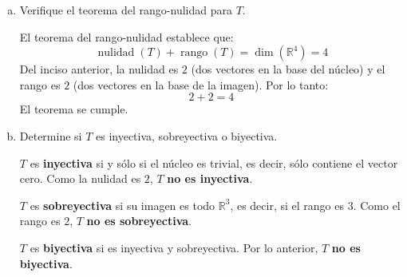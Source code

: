 \begin{prob}
\begin{enumerate}[(a)]
\item Verifique el teorema del rango-nulidad para $T$.
\begin{myproof}
El teorema del rango-nulidad establece que:
\[
\operatorname{nulidad}(T) + \operatorname{rango}(T) = \dim(\mathbb{R}^4) = 4
\]
Del inciso anterior, la nulidad es $2$ (dos vectores en la base del núcleo) y el rango es $2$ (dos vectores en la base de la imagen). Por lo tanto:
\[
2 + 2 = 4
\]
El teorema se cumple.
\end{myproof}

\item Determine si $T$ es inyectiva, sobreyectiva o biyectiva.
\begin{myproof}
$T$ es \textbf{inyectiva} si y sólo si el núcleo es trivial, es decir, sólo contiene el vector cero. Como la nulidad es $2$, $T$ \textbf{no es inyectiva}.

$T$ es \textbf{sobreyectiva} si su imagen es todo $\mathbb{R}^3$, es decir, si el rango es $3$. Como el rango es $2$, $T$ \textbf{no es sobreyectiva}.

$T$ es \textbf{biyectiva} si es inyectiva y sobreyectiva. Por lo anterior, $T$ \textbf{no es biyectiva}.
\end{myproof}
\end{enumerate}
\end{prob}
